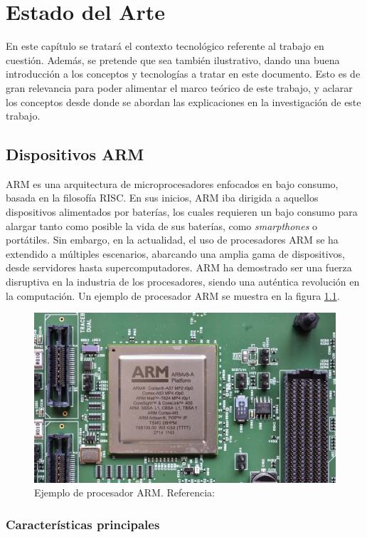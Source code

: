\chapter{Estado del Arte}
\label{cap:Estado-del-Arte}

En este capítulo se tratará el contexto tecnológico referente al trabajo en cuestión. Además, se pretende que sea también ilustrativo, dando una buena introducción a los conceptos y tecnologías a tratar en este documento. Esto es de gran relevancia para poder alimentar el marco teórico de este trabajo, y aclarar los conceptos desde donde se abordan las explicaciones en la investigación de este trabajo. 

\section{Dispositivos ARM}

\ac{ARM} \cite{arm1} \cite{arm2} es una arquitectura de microprocesadores enfocados en bajo consumo, basada en la filosofía \ac{RISC}. En sus inicios, \ac{ARM} iba dirigida a aquellos dispositivos alimentados por baterías, los cuales requieren un bajo consumo para alargar tanto como posible la vida de sus baterías, como \textit{smarpthones} o portátiles. Sin embargo, en la actualidad, el uso de procesadores \ac{ARM} se ha extendido a múltiples escenarios, abarcando una amplia gama de dispositivos, desde servidores hasta supercomputadores. \ac{ARM} ha demostrado ser una fuerza disruptiva en la industria de los procesadores, siendo una auténtica revolución en la computación. Un ejemplo de procesador \ac{ARM} se muestra en la figura \ref{procesadorArm}.

\begin{figure}[t]
    \centering
    \includegraphics[width=0.5\linewidth, height=0.3\textwidth]{figs/procesador-arquitectura-arm.png}
    \caption{Ejemplo de procesador ARM. Referencia: \cite{arm-foto}}
    \label{procesadorArm}
\end{figure}

\subsection{Características principales}


